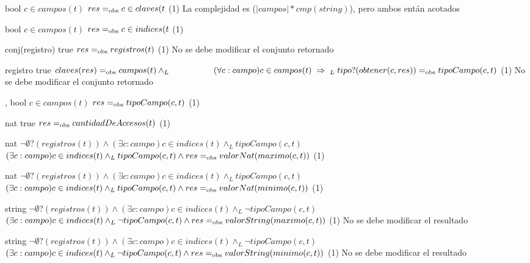 {   
    }
{bool}
{$c \in campos(t)$}
{$res =_{\mathrm{obs}} c \in claves(t$}
{\bigo(1)}
{}
{La complejidad es \bigo($|campos| * cmp(string)$), pero ambos entán acotados}

{   
    }
{bool}
{$c \in campos(t)$}
{$res =_{\mathrm{obs}} c \in indices(t$}
{\bigo(1)}
{}
{}

{   }
{conj(registro)}
{true}
{$res =_{\mathrm{obs}} registros(t)$}
{\bigo(1)}
{No se debe modificar el conjunto retornado}
{}

{   }
{registro}
{true}
{$claves(res) \igobs campos(t) \land_L \\
    \hspace*{5em} (\forall c : campo) c \in campos(t) \implies_L \; tipo?(obtener(c,res)) \igobs tipoCampo(c,t)$}
{\bigo(1)}
{No se debe modificar el conjunto retornado}
{}

{   ,
    }
{bool}
{$c \in campos(t)$}
{$res =_{\mathrm{obs}} tipoCampo(c,t)$}
{\bigo(1)}
{}
{}

{   }
{nat}
{true}
{$res =_{\mathrm{obs}} cantidadDeAccesos(t)$}
{\bigo(1)}
{}
{}

{   }
{nat}
{$\neg\emptyset?(registros(t)) \land
    (\exists c : campo) c \in indices(t) \land_L tipoCampo(c,t)$}
{$(\exists c : campo) c \in indices(t) \land_L tipoCampo(c,t) \land
    res =_{\mathrm{obs}} valorNat(maximo(c,t))$}
{\bigo(1)}
{}
{}

{   }
{nat}
{$\neg\emptyset?(registros(t)) \land
    (\exists c : campo) c \in indices(t) \land_L tipoCampo(c,t)$}
{$(\exists c : campo) c \in indices(t) \land_L tipoCampo(c,t) \land
    res =_{\mathrm{obs}} valorNat(minimo(c,t))$}
{\bigo(1)}
{}
{}

{   }
{string}
{$\neg\emptyset?(registros(t)) \land
    (\exists c : campo) c \in indices(t) \land_L \neg tipoCampo(c,t)$}
{$(\exists c : campo) c \in indices(t) \land_L \neg tipoCampo(c,t) \land
    res =_{\mathrm{obs}} valorString(maximo(c,t))$}
{\bigo(1)}
{No se debe modificar el resultado}
{}

{   }
{string}
{$\neg\emptyset?(registros(t)) \land
    (\exists c : campo) c \in indices(t) \land_L \neg tipoCampo(c,t)$}
{$(\exists c : campo) c \in indices(t) \land_L \neg tipoCampo(c,t) \land
    res =_{\mathrm{obs}} valorString(minimo(c,t))$}
{\bigo(1)}
{No se debe modificar el resultado}
{}


